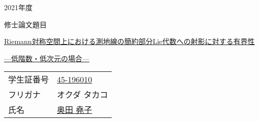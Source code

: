 \begin{titlepage}
\huge
\centering
{\Huge 2021年度}

\vspace{4cm}

\begin{center}
  修士論文題目
\end{center}

\centering
\noindent
\underline{\large Riemann対称空間上における測地線の簡約部分Lie代数への射影に対する有界性}

\underline{\large ---低階数・低次元の場合---}

\vspace{10cm}

\Large
\raggedright
\begin{tabular}{ll}
学生証番号 \quad {} & \underline{45-196010} \\
フリガナ & オクダ タカコ \\
氏名 & \underline{奥田 堯子}
\end{tabular}

\end{titlepage}